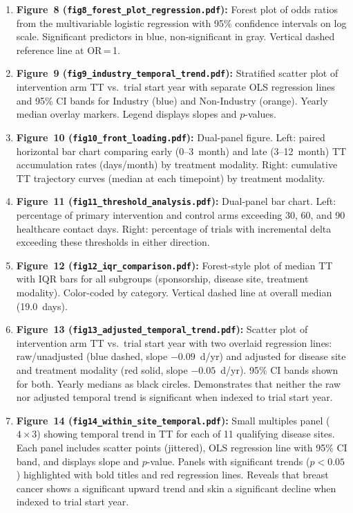 \documentclass[11pt,a4paper]{article}
\begin{document}
\begin{enumerate}
    \item \textbf{Figure~8 (\texttt{fig8\_forest\_plot\_regression.pdf}):} Forest plot of odds ratios from the multivariable logistic regression with 95\% confidence intervals on log scale. Significant predictors in blue, non-significant in gray. Vertical dashed reference line at OR\,=\,1.

    \item \textbf{Figure~9 (\texttt{fig9\_industry\_temporal\_trend.pdf}):} \label{fig:industry_temporal} Stratified scatter plot of intervention arm TT vs.\ trial start year with separate OLS regression lines and 95\% CI bands for Industry (blue) and Non-Industry (orange). Yearly median overlay markers. Legend displays slopes and $p$-values.

    \item \textbf{Figure~10 (\texttt{fig10\_front\_loading.pdf}):} \label{fig:front_loading} Dual-panel figure. Left: paired horizontal bar chart comparing early (0--3~month) and late (3--12~month) TT accumulation rates (days/month) by treatment modality. Right: cumulative TT trajectory curves (median at each timepoint) by treatment modality.

    \item \textbf{Figure~11 (\texttt{fig11\_threshold\_analysis.pdf}):} Dual-panel bar chart. Left: percentage of primary intervention and control arms exceeding 30, 60, and 90 healthcare contact days. Right: percentage of trials with incremental delta exceeding these thresholds in either direction.

    \item \textbf{Figure~12 (\texttt{fig12\_iqr\_comparison.pdf}):} \label{fig:iqr} Forest-style plot of median TT with IQR bars for all subgroups (sponsorship, disease site, treatment modality). Color-coded by category. Vertical dashed line at overall median (19.0~days).

    \item \textbf{Figure~13 (\texttt{fig13\_adjusted\_temporal\_trend.pdf}):} \label{fig:adjusted_temporal} Scatter plot of intervention arm TT vs.\ trial start year with two overlaid regression lines: raw/unadjusted (blue dashed, slope $-0.09$~d/yr) and adjusted for disease site and treatment modality (red solid, slope $-0.05$~d/yr). 95\% CI bands shown for both. Yearly medians as black circles. Demonstrates that neither the raw nor adjusted temporal trend is significant when indexed to trial start year.

    \item \textbf{Figure~14 (\texttt{fig14\_within\_site\_temporal.pdf}):} \label{fig:within_site} Small multiples panel ($4 \times 3$) showing temporal trend in TT for each of 11 qualifying disease sites. Each panel includes scatter points (jittered), OLS regression line with 95\% CI band, and displays slope and $p$-value. Panels with significant trends ($p<0.05$) highlighted with bold titles and red regression lines. Reveals that breast cancer shows a significant upward trend and skin a significant decline when indexed to trial start year.


\end{enumerate}
\end{document}
